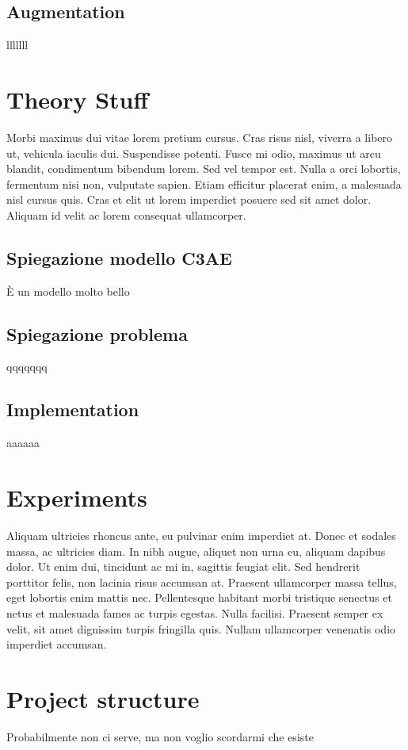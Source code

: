 \documentclass[a4paper]{report}
\begin{document}
\section{Augmentation}
lllllll

\chapter{Theory Stuff}
Morbi maximus dui vitae lorem pretium cursus. Cras risus nisl, viverra a libero ut, vehicula iaculis dui. Suspendisse potenti. Fusce mi odio, maximus ut arcu blandit, condimentum bibendum lorem. Sed vel tempor est. Nulla a orci lobortis, fermentum nisi non, vulputate sapien. Etiam efficitur placerat enim, a malesuada nisl cursus quis. Cras et elit ut lorem imperdiet posuere sed sit amet dolor. Aliquam id velit ac lorem consequat ullamcorper.
\section{Spiegazione modello C3AE}
È un modello molto bello
\section{Spiegazione problema}
qqqqqqq
\section{Implementation}
aaaaaa

\chapter{Experiments}
Aliquam ultricies rhoncus ante, eu pulvinar enim imperdiet at. Donec et sodales massa, ac ultricies diam. In nibh augue, aliquet non urna eu, aliquam dapibus dolor. Ut enim dui, tincidunt ac mi in, sagittis feugiat elit. Sed hendrerit porttitor felis, non lacinia risus accumsan at. Praesent ullamcorper massa tellus, eget lobortis enim mattis nec. Pellentesque habitant morbi tristique senectus et netus et malesuada fames ac turpis egestas. Nulla facilisi. Praesent semper ex velit, sit amet dignissim turpis fringilla quis. Nullam ullamcorper venenatis odio imperdiet accumsan.

\chapter{Project structure}
Probabilmente non ci serve, ma non voglio scordarmi che esiste
\end{document}
